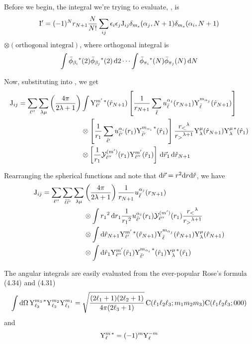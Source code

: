 \documentclass[aps,pra,groupedaddress,12pt,
               amsfonts,amssymb,
               preprint
    ]{revtex4}
\begin{document}
Before we begin, the integral we're trying to evaluate, , is
\begin{equation}
  \label{eq:Iexba}
  \mathrm{I}' =
  (-1)^{N}r_{N+1}\dfrac{N}{N!}\sum_{ij}\epsilon_i\epsilon_j\mathrm{J}_{ij}\delta_{m_s}(\alpha_j,N+1)\delta_{m_s}(\alpha_i,N+1)
\end{equation}
$\otimes(\text{orthogonal integral})$, where orthogonal integral is
\begin{equation*}
  \int\bar{\phi}_{\beta_i}{}^*(2)\bar{\phi}_{\beta_j}{}^*(2)\,\mathrm{d} 2\cdots\int\bar{\phi}_{\pi_i}{}^*(N)\bar{\phi}_{\pi_j}(N)\,\mathrm{d} N 
\end{equation*}

Now, substituting  into , we get
\begin{equation}
  \label{eq:Iexc}
  \begin{split}
  \mathrm{J}_{ij} = \sum_{\ell''}\sum_{\lambda\mu}\left(\dfrac{4\pi}{2\lambda+1}\right)
  & \int\mathrm{Y}_{\ell'}^{m'\,*}(\hat{r}_{N+1})\left[\dfrac{1}{r_{N+1}}\sum_{\bar{\ell}}u_{\bar{\ell}}^{{\alpha_j}}(r_{N+1})\mathrm{Y}_{\bar{\ell}}^{m_{{\alpha_j}}}(\hat{r}_{N+1})\right] \\
  & \otimes\left[\dfrac{1}{r_1}\sum_{\bar{\ell}'}u_{\bar{\ell}'}^{{\alpha_i}}(r_1)\mathrm{Y}_{\bar{\ell}'}^{m_{{\alpha_i}}\,*}(\hat{r}_1)\right]\dfrac{r_<{}^\lambda}{r_>{}^{\lambda+1}}\mathrm{Y}_{\lambda}^{\mu}(\hat{r}_{N+1})\mathrm{Y}_{\lambda}^{\mu\,*}(\hat{r}_{1}) \\
  & \otimes\left[\dfrac{1}{r_1}\mathcal{Y}_{\ell''}^{(m')}(r_1)\mathrm{Y}_{\ell''}^{m'}(\hat{r}_1)\right]\,\mathrm{d}\vec{r}_1\,\mathrm{d}\hat{r}_{N+1}
  \end{split}
\end{equation}

Rearranging the spherical functions and note that $\mathrm{d}\vec{r} = r^2\mathrm{d}
r\mathrm{d}\hat{r}$, we have
\begin{equation}
  \label{eq:Iexd}
  \begin{split}
  \mathrm{J}_{ij} = \sum_{\ell''}\sum_{\bar{\ell}\bar{\ell}'}\sum_{\lambda\mu}
            & \left(\dfrac{4\pi}{2\lambda+1}\right)\dfrac{1}{r_{N+1}}u_{\bar{\ell}}^{{\alpha_j}}(r_{N+1}) \\
            & \otimes\int r_1{}^2\,\mathrm{d}
               r_1\dfrac{1}{r_1{}^2}u_{\bar{\ell}'}^{{\alpha_i}}(r_1)\mathcal{Y}_{\ell''}^{(m')}(r_1)\dfrac{r_<{}^\lambda}{r_>{}^{\lambda+1}} \\
            & \otimes\int\mathrm{d}\hat{r}_{N+1}\mathrm{Y}_{\ell'}^{m'\,*}(\hat{r}_{N+1})\mathrm{Y}_{\bar{\ell}}^{m_{{\alpha_j}}}(\hat{r}_{N+1})\mathrm{Y}_{\lambda}^{\mu}(\hat{r}_{N+1}) \\
            & \otimes\int\mathrm{d}\hat{r}_1\mathrm{Y}_{\ell''}^{m'}(\hat{r}_1)\mathrm{Y}_{\bar{\ell}'}^{m_{{\alpha_i}}\,*}(\hat{r}_1)\mathrm{Y}_{\lambda}^{\mu\,*}(\hat{r}_{1})
  \end{split}
\end{equation}

The angular integrals are easily evaluated from the ever-popular Rose's
formula (4.34) and (4.31) \cite{MER1957}
\begin{equation}
  \label{eq:shadd}
  \int\mathrm{d}\Omega\,\mathrm{Y}_{\ell_3}^{m_3\,*}\mathrm{Y}_{\ell_2}^{m_2}\mathrm{Y}_{\ell_1}^{m_1} = 
  \sqrt{\dfrac{(2\ell_1+1)(2\ell_2+1)}{4\pi(2\ell_3+1)}}\,\mathrm{C}(\ell_1\ell_2\ell_3;m_1m_2m_3)\mathrm{C}(\ell_1\ell_2\ell_3;000)
\end{equation}
and
\begin{equation}
  \label{eq:consh}
  \mathrm{Y}_{\ell}^{m\,*} = (-1)^m\mathrm{Y}_{\ell}^{-m}
\end{equation}
\end{document}
